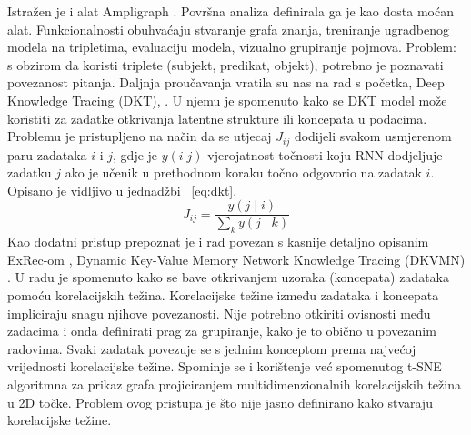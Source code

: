 \newline
Istražen je i alat Ampligraph \citep{ampl1, ampl2}. Površna analiza definirala ga je kao dosta moćan alat. Funkcionalnosti obuhvaćaju stvaranje grafa znanja, treniranje ugradbenog modela na tripletima, evaluaciju modela, vizualno grupiranje pojmova.
Problem: s obzirom da koristi triplete (subjekt, predikat, objekt), potrebno je poznavati povezanost pitanja.\newline
\newline
Daljnja proučavanja vratila su nas na rad s početka, Deep Knowledge Tracing (DKT), \citep{dkt}. U njemu je spomenuto kako se DKT model može koristiti za zadatke otkrivanja latentne strukture ili koncepata u podacima. Problemu je pristupljeno na način da se utjecaj $J_{ij}$ dodijeli svakom usmjerenom paru zadataka $i$ i $j$, gdje je $y(i | j)$ vjerojatnost točnosti koju RNN dodjeljuje zadatku $j$ ako je učenik u prethodnom koraku točno odgovorio na zadatak $i$. Opisano je vidljivo u jednadžbi ~\ref{eq:dkt}.
\begin{equation}
J_{i j}=\frac{y(j \mid i)}{\sum_{k} y(j \mid k)}\label{eq:dkt}
\end{equation}
\newline
Kao dodatni pristup prepoznat je i rad povezan s kasnije detaljno opisanim ExRec-om \citep{exrec}, Dynamic Key-Value Memory Network Knowledge Tracing (DKVMN) \citep{dkvmn}. U radu je spomenuto kako se bave otkrivanjem uzoraka (koncepata) zadataka pomoću korelacijskih težina. Korelacijske težine između zadataka i koncepata impliciraju snagu njihove povezanosti. Nije potrebno otkiriti ovisnosti među zadacima i onda definirati prag za grupiranje, kako je to obično u povezanim radovima. Svaki zadatak povezuje se s jednim konceptom prema najvećoj vrijednosti korelacijske težine. Spominje se i korištenje već spomenutog t-SNE algoritmna \citep{tdsne} za prikaz grafa projiciranjem multidimenzionalnih korelacijskih težina u 2D točke. Problem ovog pristupa je što nije jasno definirano kako stvaraju korelacijske težine. 